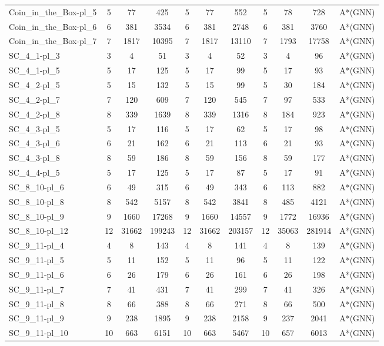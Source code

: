 \documentclass{article}
\begin{document}
\begin{longtable}[!ht]{l|ccc|ccc|cccc}
Coin\_in\_the\_Box-pl\_5 & 5 & 77 & 425 & 5 & 77 & 552 & 5 & 78 & 728 & A*(GNN) \\
Coin\_in\_the\_Box-pl\_6 & 6 & 381 & 3534 & 6 & 381 & 2748 & 6 & 381 & 3760 & A*(GNN) \\
Coin\_in\_the\_Box-pl\_7 & 7 & 1817 & 10395 & 7 & 1817 & 13110 & 7 & 1793 & 17758 & A*(GNN) \\
SC\_4\_1-pl\_3 & 3 & 4 & 51 & 3 & 4 & 52 & 3 & 4 & 96 & A*(GNN) \\
SC\_4\_1-pl\_5 & 5 & 17 & 125 & 5 & 17 & 99 & 5 & 17 & 93 & A*(GNN) \\
SC\_4\_2-pl\_5 & 5 & 15 & 132 & 5 & 15 & 99 & 5 & 30 & 184 & A*(GNN) \\
SC\_4\_2-pl\_7 & 7 & 120 & 609 & 7 & 120 & 545 & 7 & 97 & 533 & A*(GNN) \\
SC\_4\_2-pl\_8 & 8 & 339 & 1639 & 8 & 339 & 1316 & 8 & 184 & 923 & A*(GNN) \\
SC\_4\_3-pl\_5 & 5 & 17 & 116 & 5 & 17 & 62 & 5 & 17 & 98 & A*(GNN) \\
SC\_4\_3-pl\_6 & 6 & 21 & 162 & 6 & 21 & 113 & 6 & 21 & 93 & A*(GNN) \\
SC\_4\_3-pl\_8 & 8 & 59 & 186 & 8 & 59 & 156 & 8 & 59 & 177 & A*(GNN) \\
SC\_4\_4-pl\_5 & 5 & 17 & 125 & 5 & 17 & 87 & 5 & 17 & 91 & A*(GNN) \\
SC\_8\_10-pl\_6 & 6 & 49 & 315 & 6 & 49 & 343 & 6 & 113 & 882 & A*(GNN) \\
SC\_8\_10-pl\_8 & 8 & 542 & 5157 & 8 & 542 & 3841 & 8 & 485 & 4121 & A*(GNN) \\
SC\_8\_10-pl\_9 & 9 & 1660 & 17268 & 9 & 1660 & 14557 & 9 & 1772 & 16936 & A*(GNN) \\
SC\_8\_10-pl\_12 & 12 & 31662 & 199243 & 12 & 31662 & 203157 & 12 & 35063 & 281914 & A*(GNN) \\
SC\_9\_11-pl\_4 & 4 & 8 & 143 & 4 & 8 & 141 & 4 & 8 & 139 & A*(GNN) \\
SC\_9\_11-pl\_5 & 5 & 11 & 152 & 5 & 11 & 96 & 5 & 11 & 122 & A*(GNN) \\
SC\_9\_11-pl\_6 & 6 & 26 & 179 & 6 & 26 & 161 & 6 & 26 & 198 & A*(GNN) \\
SC\_9\_11-pl\_7 & 7 & 41 & 431 & 7 & 41 & 299 & 7 & 41 & 326 & A*(GNN) \\
SC\_9\_11-pl\_8 & 8 & 66 & 388 & 8 & 66 & 271 & 8 & 66 & 500 & A*(GNN) \\
SC\_9\_11-pl\_9 & 9 & 238 & 1895 & 9 & 238 & 2158 & 9 & 237 & 2041 & A*(GNN) \\
SC\_9\_11-pl\_10 & 10 & 663 & 6151 & 10 & 663 & 5467 & 10 & 657 & 6013 & A*(GNN) \\

\end{longtable}
\end{document}
